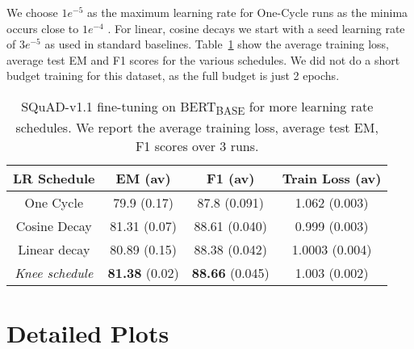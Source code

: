 \documentclass[twoside,11pt]{article}
\newcommand{\lrschedule}{\textit{Knee schedule}}
\begin{document}
We choose $1e^{-5}$ as the maximum learning rate for One-Cycle runs as the minima occurs close to $1e^{-4}$ . For linear, cosine decays we start with a seed learning rate of $3e^{-5}$ as used in standard baselines.  Table~\ref{tab:squad_results_extra_baselines} show the average training loss, average test EM and F1 scores for the various schedules. We did not do a short budget training for this dataset, as the full budget is just 2 epochs.

\begin{table}[h!]
\small
\centering
\caption{SQuAD-v1.1 fine-tuning on BERT\textsubscript{BASE} for more learning rate schedules. We report the average training loss, average test EM, F1 scores over 3 runs.}
\label{tab:squad_results_extra_baselines}
\begin{tabular}{cccc}
  \toprule
  LR Schedule    & EM (av)  & F1 (av) & Train Loss (av)  \\ 
  \midrule
  One Cycle        & 79.9 (0.17) & 87.8 (0.091) & 1.062 (0.003) \\
  Cosine Decay      & 81.31 (0.07) & 88.61 (0.040) & 0.999 (0.003) \\
  Linear decay      & 80.89 (0.15) & 88.38 (0.042) & 1.0003 (0.004)\\
  \lrschedule{}     & \textbf{81.38} (0.02)  & \textbf{88.66} (0.045) & 1.003 (0.002)\\
  \bottomrule
\end{tabular}
\end{table}









 \clearpage
\section{Detailed Plots}
\label{sec:detailed_plots}
\end{document}
